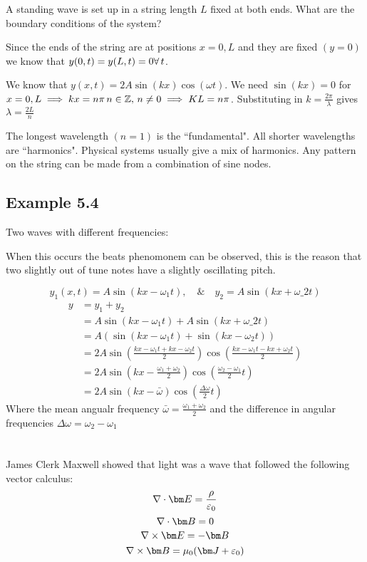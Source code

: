 A standing wave is set up in a string length \(L\) fixed at both ends. What are the boundary conditions of the system?

Since the ends of the string are at positions \(x=0,L\) and they are fixed \((y=0)\) we know that \(y(0,t)=y(L,t)=0\forall\, t\).

We know that \(y(x,t)=2A\sin(kx)\cos(\omega t)\). We need \(\sin(kx)=0\) for \(x=0,L\implies kx=n\pi\, n\in\mathbb{Z},\,n\ne0\implies KL=n\pi\). Substituting in \(k=\frac{2\pi}{\lambda}\) gives \(\lambda=\frac{2L}{n}\)

The longest wavelength \((n=1)\) is the ``fundamental". All shorter wavelengths are ``harmonics". Physical systems usually give a mix of harmonics. Any pattern on the string can be made from a combination of sine nodes.

\subsection*{Example 5.4}

Two waves with different frequencies:

When this occurs the beats phenomonem can be observed, this is the reason that two slightly out of tune notes have a slightly oscillating pitch.

\[y_1(x,t)=A\sin(kx-\omega_1 t),\quad\&\quad y_2=A\sin(kx+\omega \_2t)\]
\begin{align*}
y&=y_1+y_2\\
&=A\sin\left(kx-\omega_1 t\right)+A\sin\left(kx+\omega \_2t\right)\\
&=A(\sin\left(kx-\omega_1t\right)+\sin\left(kx-\omega_2t\right))\\
&=2A\sin\left(\frac{kx-\omega_1t+kx-\omega_2t}{2}\right)\cos\left(\frac{kx-\omega_1t-kx+\omega_2t}{2}\right)\\
&=2A\sin\left(kx-\frac{\omega_1+\omega_2}{2}\right)\cos\left(\frac{\omega_2-\omega_1}{2}t\right)\\
&=2A\sin\left(kx-\bar{\omega}\right)\cos\left(\frac{\Delta \omega}{2}t\right)
\end{align*} 
Where the mean angualr frequency \(\bar\omega=\frac{\omega_1+\omega_2}{2}\) and the difference in angular frequencies \(\Delta\omega=\omega_2-\omega_1\)

\section{}

James Clerk Maxwell showed that light was a wave that followed the following vector calculus:
\[\nabla\cdot\vv E=\frac{\rho}{\varepsilon_0}\]
\[\nabla\cdot\vv B=0\]
\[\nabla\times\vv E=-\vv B\]
\[\nabla\times\vv B=\mu_0(\vv J+\varepsilon_0)\]


